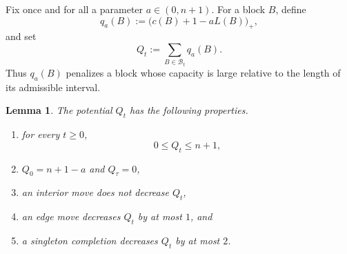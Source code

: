 \documentclass[11pt,reqno,letterpaper]{amsart}
\newtheorem{lemma}[theorem]{Lemma}
\theoremstyle{definition}
\numberwithin{equation}{section}
\newcommand{\cB}{\mathcal{B}}
\begin{document}
\medskip

Fix once and for all a parameter $a\in(0,n+1)$. For a block $B$, define
\[
q_a(B):= \bigl(c(B)+1-aL(B)\bigr)_+,
\]
and set
\[
Q_t:=\sum_{B \in \cB_t} q_a(B).
\]
Thus \(q_a(B)\) penalizes a block whose capacity is large relative to the length of its admissible interval.

\begin{lemma}\label{lem:easy_properties}
The potential $Q_t$ has the following properties.
\begin{enumerate}
\item for every $t\ge 0$,
\[
0\le Q_t\le n+1,
\]
\item $Q_0= n+1-a $ and $Q_\tau=0$,
\item an interior move does not decrease $Q_t$,
\item an edge move decreases $Q_t$ by at most $1$, and
\item a singleton completion decreases $Q_t$ by at most $2$.
\end{enumerate}
\end{lemma}
\end{document}
